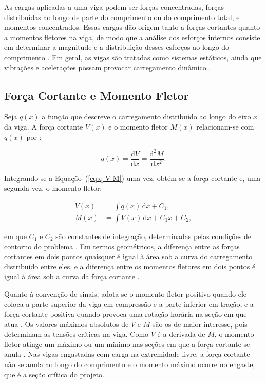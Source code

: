 \documentclass[arial,centeredequations,english,brazilian,oneside,section=TITLE]{ifes8}
\begin{document}
As cargas aplicadas a uma viga podem ser forças concentradas, forças distribuídas ao
longo de parte do comprimento ou do comprimento total, e momentos concentrados. Essas
cargas dão origem tanto a forças cortantes quanto a momentos fletores na viga, de
modo que a análise dos esforços internos consiste em determinar a magnitude e a
distribuição desses esforços ao longo do comprimento \cite{Norton2013}. Em
geral, as vigas são tratadas como sistemas estáticos, ainda que vibrações e acelerações
possam provocar carregamento dinâmico \cite{Norton2013}.

\subsection{Força Cortante e Momento Fletor}
\label{sub:cortante-momento}

Seja $q(x)$ a função que descreve o carregamento distribuído ao longo do eixo $x$ da
viga. A força cortante $V(x)$ e o momento fletor $M(x)$ relacionam-se com $q(x)$ por
\cite{Norton2013}:

\begin{equation}
  \label{eq:q-V-M}
  q(x) = \frac{\mathrm{d}V}{\mathrm{d}x} = \frac{\mathrm{d}^2 M}{\mathrm{d}x^2}.
\end{equation}

Integrando-se a Equação~(\ref{eq:q-V-M}) uma vez, obtém-se a força cortante e, uma
segunda vez, o momento fletor:

\begin{align}
  V(x) &= \int q(x)\,\mathrm{d}x + C_1, \label{eq:V-integral}\\
  M(x) &= \int V(x)\,\mathrm{d}x + C_1 x + C_2, \label{eq:M-integral}
\end{align}

em que $C_1$ e $C_2$ são constantes de integração, determinadas pelas condições de
contorno do problema \cite{Norton2013}. Em termos geométricos, a
diferença entre as forças cortantes em dois pontos quaisquer é igual à área sob a curva
do carregamento distribuído entre eles, e a diferença entre os momentos fletores em dois
pontos é igual à área sob a curva da força cortante \cite{Norton2013}.

Quanto à convenção de sinais, adota-se o momento fletor positivo quando ele coloca
a parte superior da viga em compressão e a parte inferior em tração, e a força
cortante positiva quando provoca uma rotação horária na seção em que atua
\cite{Norton2013}. Os valores máximos absolutos
de $V$ e $M$ são os de maior interesse, pois determinam as tensões críticas na viga.
Como $V$ é a derivada de $M$, o momento fletor atinge um máximo ou um mínimo nas
seções em que a força cortante se anula \cite{Norton2013}. Nas vigas
engastadas com carga na extremidade livre, a força cortante não se anula ao longo do
comprimento e o momento máximo ocorre no engaste, que é a seção crítica do projeto.
\end{document}
